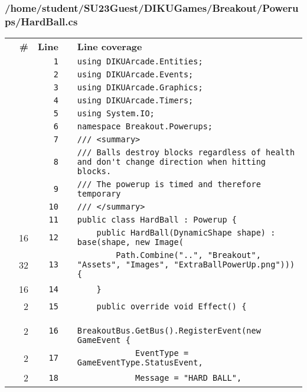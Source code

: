 \documentclass[a4paper,landscape,10pt]{article}
\begin{document}
\subsubsection{/home/student/SU23Guest/DIKUGames/Breakout/Powerups/HardBall.cs}
\begin{longtable}[l]{lrrll}
\textbf{} & \textbf{\#} & \textbf{Line} & \textbf{} & \textbf{Line coverage}\\
\cellcolor{gray} &  & \verb~1~ & & \verb~using DIKUArcade.Entities;~\\
\cellcolor{gray} &  & \verb~2~ & & \verb~using DIKUArcade.Events;~\\
\cellcolor{gray} &  & \verb~3~ & & \verb~using DIKUArcade.Graphics;~\\
\cellcolor{gray} &  & \verb~4~ & & \verb~using DIKUArcade.Timers;~\\
\cellcolor{gray} &  & \verb~5~ & & \verb~using System.IO;~\\
\cellcolor{gray} &  & \verb~6~ & & \verb~namespace Breakout.Powerups;~\\
\cellcolor{gray} &  & \verb~7~ & & \verb~/// <summary>~\\
\cellcolor{gray} &  & \verb~8~ & & \verb~/// Balls destroy blocks regardless of health and don't change direction when hitting blocks.~\\
\cellcolor{gray} &  & \verb~9~ & & \verb~/// The powerup is timed and therefore temporary~\\
\cellcolor{gray} &  & \verb~10~ & & \verb~/// </summary>~\\
\cellcolor{gray} &  & \verb~11~ & & \verb~public class HardBall : Powerup {~\\
\cellcolor{green} & 16 & \verb~12~ & & \verb~    public HardBall(DynamicShape shape) : base(shape, new Image(~\\
\cellcolor{green} & 32 & \verb~13~ & & \verb~        Path.Combine("..", "Breakout", "Assets", "Images", "ExtraBallPowerUp.png"))) {~\\
\cellcolor{green} & 16 & \verb~14~ & & \verb~    }~\\
\cellcolor{green} & 2 & \verb~15~ & & \verb~    public override void Effect() {~\\
\cellcolor{green} & 2 & \verb~16~ & & \verb~        BreakoutBus.GetBus().RegisterEvent(new GameEvent {~\\
\cellcolor{green} & 2 & \verb~17~ & & \verb~            EventType = GameEventType.StatusEvent,~\\
\cellcolor{green} & 2 & \verb~18~ & & \verb~            Message = "HARD BALL",~\\

\end{longtable}
\end{document}
